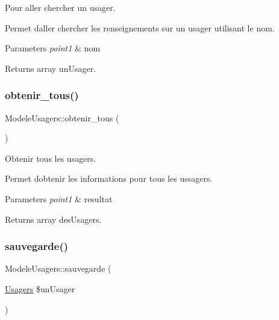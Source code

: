 Pour aller chercher un usager. 

Permet d\textquotesingle{}aller chercher les renseignements sur un usager utilisant le nom. 
\begin{DoxyParams}{Parameters}
{\em point1} & nom \\
\hline
\end{DoxyParams}
\begin{DoxyReturn}{Returns}
array un\+Usager. 
\end{DoxyReturn}
\mbox{\label{class_modele_usagers_a26c77b2091c8f8d01cfbaa5d3f257d44}} 
\subsubsection{\texorpdfstring{obtenir\+\_\+tous()}{obtenir\_tous()}}
{\footnotesize\ttfamily Modele\+Usagers\+::obtenir\+\_\+tous (\begin{DoxyParamCaption}{ }\end{DoxyParamCaption})}



Obtenir tous les usagers. 

Permet d\textquotesingle{}obtenir les informations pour tous les ussagers. 
\begin{DoxyParams}{Parameters}
{\em point1} & resultat \\
\hline
\end{DoxyParams}
\begin{DoxyReturn}{Returns}
array des\+Usagers. 
\end{DoxyReturn}
\mbox{\label{class_modele_usagers_a10d5d6667e96fbe193e01ecd222c3f84}} 
\subsubsection{\texorpdfstring{sauvegarde()}{sauvegarde()}}
{\footnotesize\ttfamily Modele\+Usagers\+::sauvegarde (\begin{DoxyParamCaption}\item[{\hyperlink{class_usagers}{Usagers}}]{\$un\+Usager }\end{DoxyParamCaption})}



